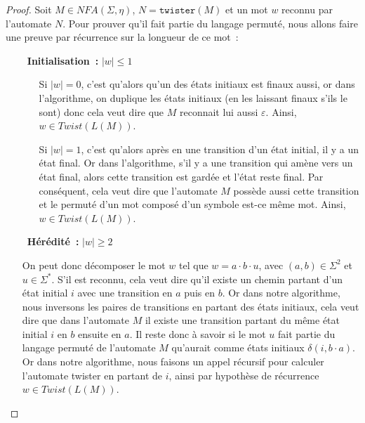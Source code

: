 \begin{proof}\label{proof:perm_rec}
  Soit \(M \in NFA(\Sigma, \eta)\), \(N = \texttt{twister}(M)\) et un mot
  \(w\) reconnu par l'automate \(N\). Pour prouver qu'il fait partie du
  langage permuté, nous allons faire une preuve par récurrence sur la longueur
  de ce mot~:

  \vphantom{}

  \begin{itemize}
    \item[\bullet~\textbf{Initialisation~:}] \(\lvert w \rvert \leq 1\)
      \begin{itemize}
        \item[\circ] Si \(\lvert w \rvert = 0\), c'est qu'alors qu'un des
          états initiaux est finaux aussi, or dans l'algorithme, on duplique
          les états initiaux (en les laissant finaux s'ils le sont) donc cela
          veut dire que \(M\) reconnait lui aussi \(\varepsilon\). Ainsi,
          \(w \in Twist(L(M))\).

        \vphantom{}

        \item[\circ] Si \(\lvert w \rvert = 1\), c'est qu'alors après en une
          transition d'un état initial, il y a un état final. Or dans
          l'algorithme, s'il y a une transition qui amène vers un état final,
          alors cette transition est gardée et l'état reste final. Par
          conséquent, cela veut dire que l'automate \(M\) possède aussi cette
          transition et le permuté d'un mot composé d'un symbole est-ce même
          mot. Ainsi, \(w \in Twist(L(M))\).
      \end{itemize}

      \vphantom{}

    \item[\bullet~\textbf{Hérédité~:}] \(\lvert w \rvert \geq 2\)

      On peut donc décomposer le mot \(w\) tel que \(w = a \cdot b \cdot u\),
      avec \((a, b) \in \Sigma^2\) et \(u \in \Sigma^*\). S'il est reconnu,
      cela veut dire qu'il existe un chemin partant d'un état initial \(i\)
      avec une transition en \(a\) puis en \(b\). Or dans notre algorithme,
      nous inversons les paires de transitions en partant des états initiaux,
      cela veut dire que dans l'automate \(M\) il existe une transition
      partant du même état initial \(i\) en \(b\) ensuite en \(a\). Il reste
      donc à savoir si le mot \(u\) fait partie du langage permuté de
      l'automate \(M\) qu'aurait comme états initiaux \(\delta(i, b
      \cdot a)\). Or dans notre algorithme, nous faisons un appel récursif
      pour calculer l'automate twister en partant de \(i\), ainsi par
      hypothèse de récurrence \(w \in Twist(L(M))\).
  \end{itemize}
\end{proof}


